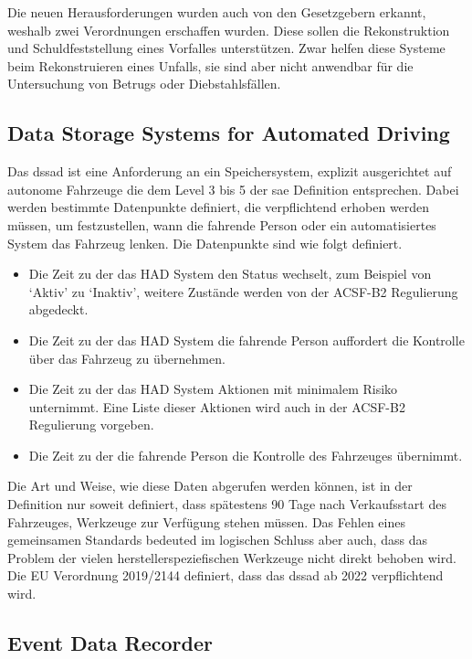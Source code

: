 \documentclass[conference,compsoc,final,a4paper]{IEEEtran}
\begin{document}
Die neuen Herausforderungen wurden auch von den Gesetzgebern erkannt, weshalb zwei Verordnungen erschaffen wurden.
Diese sollen die Rekonstruktion und Schuldfeststellung eines Vorfalles unterstützen.
Zwar helfen diese Systeme beim Rekonstruieren eines Unfalls, sie sind aber nicht anwendbar für die Untersuchung von Betrugs oder Diebstahlsfällen.~\cite{Boehm2020}

\subsection{Data Storage Systems for Automated Driving}

Das \ac{dssad} ist eine Anforderung an ein Speichersystem, explizit ausgerichtet auf autonome Fahrzeuge die dem Level 3 bis 5 der \ac{sae} Definition entsprechen.
Dabei werden bestimmte Datenpunkte definiert, die verpflichtend erhoben werden müssen, um festzustellen, wann die fahrende Person oder ein automatisiertes System das Fahrzeug lenken.
Die Datenpunkte sind wie folgt definiert.
\begin{itemize}
  \item Die Zeit zu der das \ac{HAD} System den Status wechselt, zum Beispiel von `Aktiv' zu `Inaktiv', weitere Zustände werden von der ACSF-B2 Regulierung abgedeckt.
  \item Die Zeit zu der das \ac{HAD} System die fahrende Person auffordert die Kontrolle über das Fahrzeug zu übernehmen.
  \item Die Zeit zu der das \ac{HAD} System Aktionen mit minimalem Risiko unternimmt. Eine Liste dieser Aktionen wird auch in der ACSF-B2 Regulierung vorgeben.
  \item Die Zeit zu der die fahrende Person die Kontrolle des Fahrzeuges übernimmt.
\end{itemize}

Die Art und Weise, wie diese Daten abgerufen werden können, ist in der Definition nur soweit definiert, dass spätestens 90 Tage nach Verkaufsstart des Fahrzeuges, Werkzeuge
zur Verfügung stehen müssen. Das Fehlen eines gemeinsamen Standards bedeuted im logischen Schluss aber auch, dass das Problem der vielen
herstellerspeziefischen Werkzeuge nicht direkt behoben wird.\\
Die EU Verordnung 2019/2144 definiert, dass das \ac{dssad} ab 2022 verpflichtend wird.

\subsection{Event Data Recorder}
\end{document}
